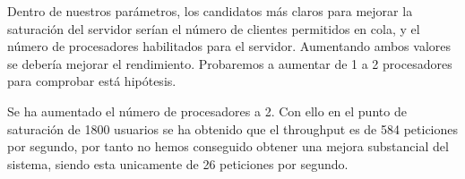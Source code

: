 \documentclass[a4paper, 12pt, spanish]{memoria}
\begin{document}
Dentro de nuestros parámetros, los candidatos más claros para mejorar la saturación del servidor serían el número de clientes permitidos en cola, y el número de procesadores habilitados para el servidor. Aumentando ambos valores se debería mejorar el rendimiento. Probaremos a aumentar de 1 a 2 procesadores para comprobar está hipótesis.

Se ha aumentado el número de procesadores a 2. Con ello en el punto de saturación de 1800 usuarios se ha obtenido que el throughput es de 584 peticiones por segundo, por tanto no hemos conseguido obtener una mejora substancial del sistema, siendo esta unicamente de 26 peticiones por segundo.
\end{document}
